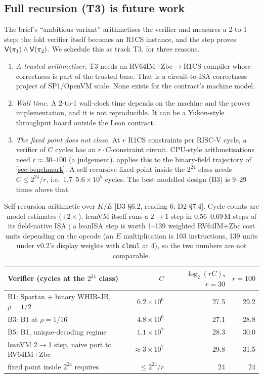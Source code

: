 \subsection{Full recursion (T3) is future work}\label{subsec:rec-t3}

The brief's \enquote{ambitious variant} arithmetises the verifier and measures a 2-to-1 step: the
fold verifier itself becomes an R1CS instance, and the step proves $\mathsf{V}(\pi_1)\wedge\mathsf{V}(\pi_2)$.
We schedule this as track T3, for three reasons.
\begin{enumerate}[nosep]
\item \emph{A trusted arithmetiser.} T3 needs an RV64IM+Zbc$\to$R1CS compiler whose correctness is
  part of the trusted base. That is a circuit-to-ISA correctness project of SP1/OpenVM scale. None
  exists for the contract's machine model.
\item \emph{Wall time.} A 2-to-1 wall-clock time depends on the machine and the prover
  implementation, and it is not reproducible. It can be a Yukon-style throughput board outside the
  Lean contract.
\item \emph{The fixed point does not close.} At $r$ R1CS constraints per RISC-V cycle, a verifier of
  $C$ cycles has an $r\cdot C$-constraint circuit. CPU-style arithmetisations need $r\approx30$--$100$
  (a judgement).  applies this to the binary-field trajectory of
  \cref{sec:benchmark}. A self-recursive fixed point inside the $2^{24}$ class needs
  $C\le2^{24}/r$, i.e.\ $1.7$--$5.6\times10^5$ cycles. The best modelled design (B3) is 9--29 times
  above that.
\end{enumerate}

\begin{table}[t]
\centering\small
\begin{tabular}{@{}lrrr@{}}
\toprule
Verifier (cycles at the $2^{24}$ class) & $C$ & $\log_2(rC)$, $r=30$ & $r=100$ \\
\midrule
B1: Spartan + binary WHIR-JB, $\rho=1/2$ & $6.2\times10^6$ & 27.5 & 29.2 \\
B3: B1 at $\rho=1/16$ & $4.8\times10^6$ & 27.1 & 28.8 \\
B5: B1, unique-decoding regime & $1.1\times10^7$ & 28.3 & 30.0 \\
leanVM 2$\to$1 step, naive port to RV64IM+Zbc & $\approx3\times10^7$ & 29.8 & 31.5 \\
\midrule
fixed point inside $2^{24}$ requires & $\le2^{24}/r$ & 24 & 24 \\
\bottomrule
\end{tabular}
\caption{Self-recursion arithmetic over $K/E$ [D3 §6.2, reading 6; D2 §7.4]. Cycle counts are model
estimates ($\pm2\times$). leanVM itself runs a 2$\to$1 step in 0.56--0.69\,M steps of its
field-native ISA \cite{leanVM}; a leanISA step is worth 1--139 weighted RV64IM+Zbc cost units depending on the
opcode (an $E$ multiplication is 103 instructions, 139 units under v0.2's display weights with \texttt{clmul} at 4), so the two numbers are not comparable.}
\label{tab:rec-selfrec}
\end{table}

